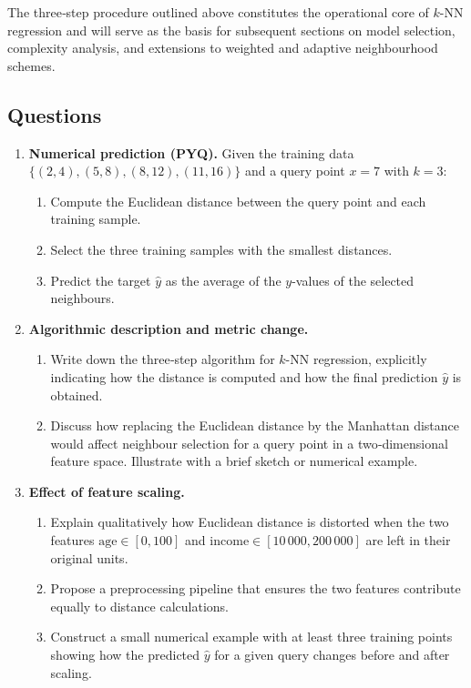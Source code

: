 \documentclass[12pt, a4paper]{article}
\begin{document}
The three‑step procedure outlined above constitutes the operational core of \(k\)-NN regression and will serve as the basis for subsequent sections on model selection, complexity analysis, and extensions to weighted and adaptive neighbourhood schemes.

\subsection*{Questions}
\begin{enumerate}
    \item \textbf{Numerical prediction (PYQ).}  
    Given the training data \(\{(2,4),(5,8),(8,12),(11,16)\}\) and a query point \(x=7\) with \(k=3\):
    \begin{enumerate}
        \item Compute the Euclidean distance between the query point and each training sample.
        \item Select the three training samples with the smallest distances.
        \item Predict the target \(\hat y\) as the average of the \(y\)-values of the selected neighbours. 
    \end{enumerate}
    
    \item \textbf{Algorithmic description and metric change.}
    \begin{enumerate}
        \item Write down the three‑step algorithm for \(k\)-NN regression, explicitly indicating how the distance is computed and how the final prediction \(\hat y\) is obtained.
        \item Discuss how replacing the Euclidean distance by the Manhattan distance would affect neighbour selection for a query point in a two‑dimensional feature space. Illustrate with a brief sketch or numerical example.
    \end{enumerate}
    
    \item \textbf{Effect of feature scaling.}
    \begin{enumerate}
        \item Explain qualitatively how Euclidean distance is distorted when the two features \(\text{age}\in[0,100]\) and \(\text{income}\in[10\,000,200\,000]\) are left in their original units.
        \item Propose a preprocessing pipeline that ensures the two features contribute equally to distance calculations.
        \item Construct a small numerical example with at least three training points showing how the predicted \(\hat y\) for a given query changes before and after scaling.
    \end{enumerate}
    

\end{enumerate}
\end{document}
